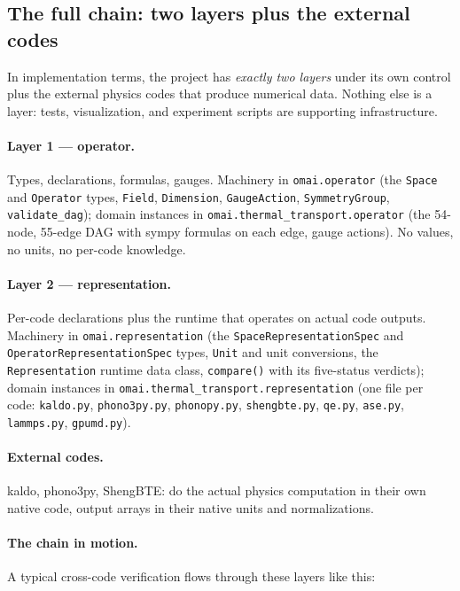 \documentclass[11pt,a4paper]{article}
\begin{document}
\subsection{The full chain: two layers plus the external codes}
\label{ssec:two-layer-chain}

In implementation terms, the project has \emph{exactly two layers} under its
own control plus the external physics codes that produce numerical data.
Nothing else is a layer: tests, visualization, and experiment scripts are
supporting infrastructure.

\paragraph{Layer 1 --- operator.} Types, declarations, formulas, gauges.
Machinery in \texttt{omai.operator} (the \texttt{Space} and
\texttt{Operator} types, \texttt{Field}, \texttt{Dimension},
\texttt{GaugeAction}, \texttt{SymmetryGroup}, \texttt{validate\_dag});
domain instances in \texttt{omai.thermal\_transport.operator} (the
54-node, 55-edge DAG with sympy formulas on each edge, gauge actions).
No values, no units, no per-code knowledge.

\paragraph{Layer 2 --- representation.} Per-code declarations plus the
runtime that operates on actual code outputs. Machinery in
\texttt{omai.representation} (the \texttt{SpaceRepresentationSpec} and
\texttt{OperatorRepresentationSpec} types, \texttt{Unit} and unit conversions,
the \texttt{Representation} runtime data class, \texttt{compare()} with
its five-status verdicts); domain instances in
\texttt{omai.thermal\_transport.representation} (one file per code:
\texttt{kaldo.py}, \texttt{phono3py.py}, \texttt{phonopy.py},
\texttt{shengbte.py}, \texttt{qe.py}, \texttt{ase.py}, \texttt{lammps.py},
\texttt{gpumd.py}).

\paragraph{External codes.} kaldo, phono3py, ShengBTE: do the actual
physics computation in their own native code, output arrays in their
native units and normalizations.

\paragraph{The chain in motion.} A typical cross-code verification flows
through these layers like this:
\end{document}
